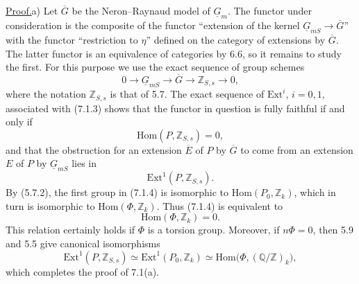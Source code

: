 
\medskip
\noindent\underline{Proof.}\quad a) Let $\overline G$ be the
Neron--Raynaud model of $\underline G_m$.  The functor under consideration
is the composite of the functor ``extension of the kernel
$\underline G_{mS}\to\overline G$'' with the functor ``restriction to
$\eta$'' defined on the category of extensions by $\overline G$.  The latter
functor is an equivalence of categories by 6.6, so it remains to study the
first.  For this purpose we use the exact sequence of group schemes
\begin{equation}\tag{7.1.3}
 0\longrightarrow\underline G_{mS}\longrightarrow\overline G
 \longrightarrow\mathbb Z_{S,s}\longrightarrow0,
\end{equation}
where the notation $\mathbb Z_{S,s}$ is that of 5.7.  The exact sequence of
$\mathrm{Ext}^i$, $i=0,1$, associated with (7.1.3) shows that the functor in
question is fully faithful if and only if
\begin{equation}\tag{7.1.4}
 \mathrm{Hom}(P,\mathbb Z_{S,s})=0,
\end{equation}
and that the obstruction for an extension $\overline E$ of $P$ by
$\overline G$ to come from an extension $E$ of $P$ by
$\underline G_{mS}$ lies in
\begin{equation}\tag{7.1.5}
 \mathrm{Ext}^1(P,\mathbb Z_{S,s}).
\end{equation}
By (5.7.2), the first group in (7.1.4) is isomorphic to
$\mathrm{Hom}(P_0,\mathbb Z_k)$, which in turn is isomorphic to
$\mathrm{Hom}(\Phi,\mathbb Z_k)$.  Thus (7.1.4) is equivalent to
\begin{equation}\tag{7.1.4 bis}
 \mathrm{Hom}(\Phi,\mathbb Z_k)=0.
\end{equation}
This relation certainly holds if $\Phi$ is a torsion group.  Moreover, if
$n\Phi=0$, then 5.9 and 5.5 give canonical isomorphisms
\begin{equation}\tag{7.1.6}
 \mathrm{Ext}^1(P,\mathbb Z_{S,s})
 \simeq\mathrm{Ext}^1(P_0,\mathbb Z_k)
 \simeq\mathrm{Hom}\bigl(\Phi,(\mathbb Q/\mathbb Z)_k\bigr),
\end{equation}
which completes the proof of 7.1(a).

